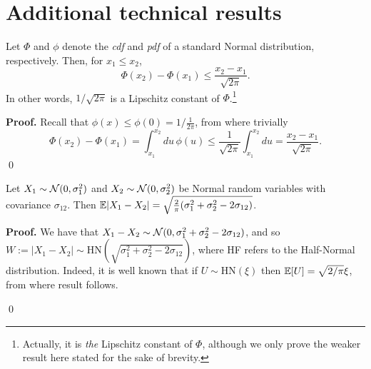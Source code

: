 

\section{Additional technical results}


\begin{lemma} \label{lemma:lipschitz}
	Let $\Phi$ and $\phi$ denote the \textit{cdf} and \textit{pdf} of a standard Normal distribution, respectively. Then, for $x_1 \leq x_2$,
	\begin{equation*}
		\Phi(x_2) - \Phi(x_1) \leq \frac{x_2 - x_1}{\sqrt{2 \pi}}.
	\end{equation*}
	In other words, $1/\sqrt{2 \pi}$ is a Lipschitz constant of $\Phi$.\footnote{Actually, it is \textit{the} Lipschitz constant of $\Phi$, although we only prove the weaker result here stated for the sake of brevity.}
\end{lemma}


\textbf{Proof. \hspace{0.05cm}} Recall that $\phi(x) \leq \phi(0) = 1 / \frac{1}{2\pi}$, from where trivially
\begin{equation*}
	\Phi(x_2) - \Phi(x_1) = \int_{x_1}^{x_2} du \, \phi(u) \leq \frac{1}{\sqrt{2 \pi}} \int_{x_1}^{x_2} du = \frac{x_2 - x_1}{\sqrt{2 \pi}}.
\end{equation*}
\qed



\begin{lemma} \label{lemma:halfnormal}
	Let $X_1 \sim \mathcal{N}(0, \sigma_1^2)$ and $X_2 \sim \mathcal{N}(0, \sigma_2^2)$ be Normal random variables with covariance $\sigma_{12}$. Then $\mathbb{E} |X_1 - X_2| = \sqrt{\frac{2}{\pi} (\sigma_1^2 + \sigma_2^2 - 2\sigma_{12})}$.
\end{lemma}

\textbf{Proof. \hspace{0.05cm}} We have that $X_1 - X_2 \sim \mathcal{N}(0, \sigma_1^2 + \sigma_2^2 - 2\sigma_{12})$, and so $W := |X_1 - X_2| \sim \mathrm{HN} (\sqrt{\sigma_1^2 + \sigma_2^2 - 2\sigma_{12}})$, where HF refers to the Half-Normal distribution. Indeed, it is well known that if $U \sim \mathrm{HN} (\xi)$ then $\mathbb{E}[U] = \sqrt{2 / \pi} \xi$, from where result follows.

\qed

